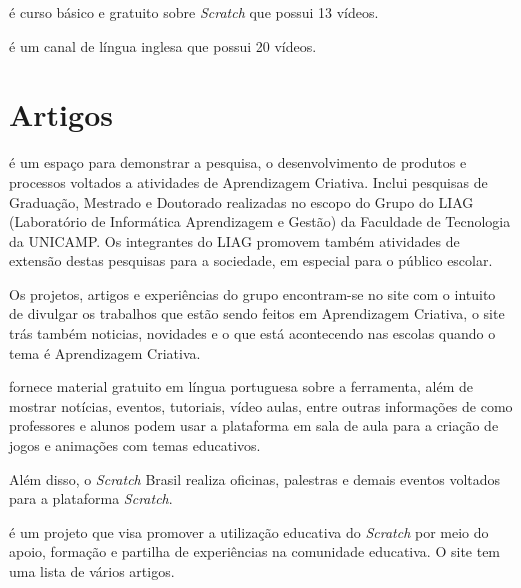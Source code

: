 \documentclass[12pt,fleqn]{book} %
\begin{document}
\textcite{cursoexcel2018} é curso básico e gratuito sobre \textit{Scratch} que possui 13 vídeos. 
	
\textcite{blank2018} é um canal de língua inglesa que possui 20 vídeos.

\section{Artigos}

\textcite{liag2018} é um espaço para demonstrar a pesquisa, o desenvolvimento de produtos e processos voltados a atividades de Aprendizagem Criativa. Inclui pesquisas de Graduação, Mestrado e Doutorado realizadas no escopo do Grupo do LIAG (Laboratório de Informática Aprendizagem e Gestão) da Faculdade de Tecnologia da UNICAMP. Os integrantes do LIAG promovem também atividades de extensão destas pesquisas para a sociedade, em especial para o público escolar.

Os projetos, artigos e experiências do grupo encontram-se no site com o intuito de divulgar os trabalhos que estão sendo feitos em Aprendizagem Criativa, o site trás também noticias, novidades e o que está acontecendo nas escolas quando o tema é Aprendizagem Criativa.

\textcite{scratchbrasil2018} fornece material gratuito em língua portuguesa sobre a ferramenta, além de mostrar notícias, eventos, tutoriais, vídeo aulas, entre outras informações de como professores e alunos podem usar a plataforma em sala de aula para a criação de jogos e animações com temas educativos.

Além disso, o \textit{Scratch} Brasil realiza oficinas, palestras e demais eventos voltados para a plataforma \textit{Scratch}.

\textcite{eduscratch2018} é um projeto que visa promover a utilização educativa do \textit{Scratch} por meio do apoio, formação e partilha de experiências na comunidade educativa. O site tem uma lista de vários artigos. 



\end{document}
